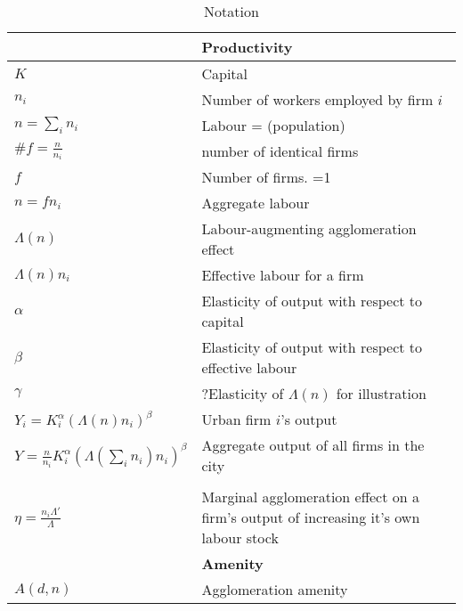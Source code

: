 \begin{longtable}{lp{10cm}}
\caption{Notation}\\
\hline
		&\textbf{Productivity}\\ \hline
$K$  &  Capital\\
$n_i$  &  Number of workers employed by firm $i$\\
$n=\sum_i n_i$  &  Labour = (population)\\
$\#f=\frac{n}{n_i}$&number of identical firms\\ %
$f$  &  Number of firms. =1\\
$n =f n_i$  &  Aggregate labour \\
$\Lambda(n)$  &  Labour-augmenting agglomeration effect \\
$\Lambda(n)n_i$  &  Effective labour for a firm\\
$\alpha$  &  Elasticity of output with respect to capital\\
$\beta$  &  Elasticity of output with respect to effective labour\\
$\gamma$  &  ?Elasticity of $\Lambda(n)$ for illustration\\

$Y_i=K_i^{\alpha }(\Lambda(n)n_i)^{\beta }$  &  Urban firm $i$'s output\\
$Y=\frac{n}{n_i}K_i^{\alpha }(\Lambda(\sum_i n_i)n_i)^{\beta }$  &  Aggregate output of all firms in the city\\
\\

$\eta=\frac{n_i\Lambda'}{\Lambda}$  &   Marginal agglomeration effect on a firm's output of increasing it's own labour stock\\
\hline
	&\textbf{Amenity}\\ \hline
$A(d, n)$   &  Agglomeration amenity\\
\hline


\end{longtable}

